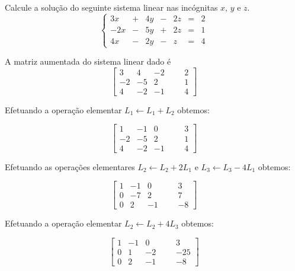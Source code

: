 
\begin{problem}
Calcule a solução do seguinte sistema linear nas incógnitas $x$, $y$ e $z$.
$$\left\{\begin{array}{rrrrrrr}
 3x & + & 4y & - & 2z & = & 2 \\
-2x & - & 5y & + & 2z & = & 1 \\
 4x & - & 2y & - &  z & = & 4 \end{array}\right. $$
\end{problem}
\begin{solution}
A matriz aumentada do sistema linear dado é
$$ \left[\begin{array}{rrrr|rr}
	3 &   4 &  -2 & & &   2  \\
 -2 &  -5 &   2 & & &   1  \\ 
	4 &  -2 &  -1 & & &   4  \end{array}\right] $$

Efetuando a operação elementar $L_1 \leftarrow L_1 + L_2$ obtemos:

$$ \left[\begin{array}{rrrr|rr}
	1 &  -1 &   0 & & &   3  \\
 -2 &  -5 &   2 & & &   1  \\ 
	4 &  -2 &  -1 & & &   4  \end{array}\right] $$

Efetuando as operações elementares $L_2 \leftarrow L_2 + 2L_1$ e $L_3 \leftarrow L_3 - 4L_1$ obtemos:

$$ \left[\begin{array}{rrrr|rr}
	1 &  -1 &   0 & & &   3  \\
	0 &  -7 &   2 & & &   7  \\ 
	0 &   2 &  -1 & & &  -8  \end{array}\right] $$

Efetuando a operação elementar $L_2 \leftarrow L_2 + 4L_3$ obtemos:

$$ \left[\begin{array}{rrrr|rr}
	1 &  -1 &   0 & & &    3  \\
	0 &   1 &  -2 & & &  -25  \\ 
	0 &   2 &  -1 & & &   -8  \end{array}\right] $$


\end{solution}

